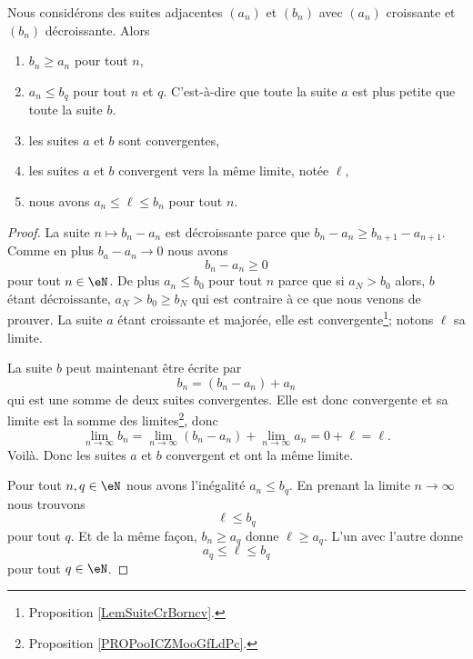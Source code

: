 \begin{theorem}   \label{THOooZJWLooAtGMxD}
	Nous considérons des suites adjacentes \( (a_n)\) et \( (b_n)\) avec \( (a_n)\) croissante et \( (b_n)\) décroissante. Alors
	\begin{enumerate}
		\item
		      \( b_n\geq a_n\) pour tout \( n\),
		\item
		      \( a_n\leq b_q\) pour tout \( n\) et \( q\). C'est-à-dire que toute la suite \( a\) est plus petite que toute la suite \( b\).
		\item
		      les suites \( a\) et \( b\) sont convergentes,
		\item
		      les suites \( a\) et \( b\) convergent vers la même limite, notée \( \ell\),
		\item
		      nous avons \( a_n\leq \ell\leq b_n\) pour tout \( n\).
	\end{enumerate}
\end{theorem}

\begin{proof}
	La suite \( n\mapsto b_n-a_n\) est décroissante parce que \( b_n-a_n\geq b_{n+1}-a_{n+1}\). Comme en plus \( b_a-a_n\to 0\) nous avons
	\begin{equation}
		b_n-a_n\geq 0
	\end{equation}
	pour tout \( n\in \eN\). De plus \( a_n\leq b_0\) pour tout \( n\) parce que si \( a_N>b_0\) alors, \( b\) étant décroissante, \( a_N>b_0\geq b_N\) qui est contraire à ce que nous venons de prouver. La suite \( a\) étant croissante et majorée, elle est convergente\footnote{Proposition \ref{LemSuiteCrBorncv}.}; notons \( \ell\) sa limite.

	La suite \( b\) peut maintenant être écrite par
	\begin{equation}
		b_n=(b_n-a_n)+a_n
	\end{equation}
	qui est une somme de deux suites convergentes. Elle est donc convergente et sa limite est la somme des limites\footnote{Proposition \ref{PROPooICZMooGfLdPc}.}, donc
	\begin{equation}
		\lim_{n\to \infty} b_n=\lim_{n\to \infty} (b_n-a_n)+\lim_{n\to \infty} a_n = 0+\ell=\ell.
	\end{equation}
	Voilà. Donc les suites \( a\) et \( b\) convergent et ont la même limite.

	Pour tout \( n,q\in \eN\) nous avons l'inégalité \( a_n\leq b_q\). En prenant la limite \( n\to \infty\) nous trouvons
	\begin{equation}
		\ell\leq b_q
	\end{equation}
	pour tout \( q\). Et de la même façon, \( b_n\geq a_q\) donne \( \ell\geq a_q\). L'un avec l'autre donne
	\begin{equation}
		a_q\leq \ell\leq b_q
	\end{equation}
	pour tout \( q\in \eN\).
\end{proof}

